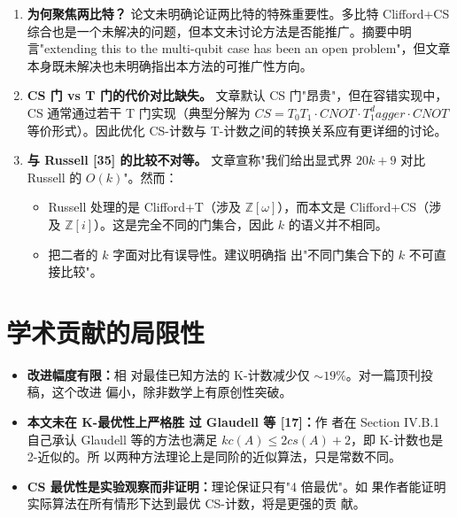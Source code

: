 \documentclass[10pt,a4paper]{article}
\def\dagger{dagger}%
\def\mathrm#1{#1}%
\begin{document}
\begin{enumerate}[label=(\roman*)]
\item \textbf{为何聚焦两比特？} 论文未明确论证两比特的特殊重要性。多比特 Clifford+CS 综合也是一个未解决的问题，但本文未讨论方法是否能推广。摘要中明言"extending this to the multi-qubit case has been an open problem"，但文章本身既未解决也未明确指出本方法的可推广性方向。
 
\item \textbf{CS 门 vs T 门的代价对比缺失。} 文章默认 CS 门"昂贵"，但在容错实现中，CS 通常通过若干 T 门实现（典型分解为 $\mathrm{CS} = T_0 T_1 \cdot \mathrm{CNOT} \cdot T_1^\dagger \cdot \mathrm{CNOT}$ 等价形式）。因此优化 CS-计数与 T-计数之间的转换关系应有更详细的讨论。
 
\item \textbf{与 Russell [35] 的比较不对等。} 文章宣称"我们给出显式界 $20k+9$ 对比 Russell 的 $O(k)$"。然而：
\begin{itemize}
\item Russell 处理的是 Clifford+T（涉及 $\mathbb{Z}[\omega]$），而本文是 Clifford+CS（涉及 $\mathbb{Z}[i]$）。这是完全不同的门集合，因此 $k$ 的语义并不相同。
\item 把二者的 $k$ 字面对比有误导性。建议明确指
  出"不同门集合下的 $k$ 不可直接比较"。
\end{itemize}
\end{enumerate}
 
\section{学术贡献的局限性}
 
\begin{itemize}
\item \textbf{改进幅度有限：}相
  对最佳已知方法的 K-计数减少仅 ${\sim}19\%$。对一篇顶刊投稿，这个改进
  偏小，除非数学上有原创性突破。
 
\item \textbf{本文未在 K-最优性上严格胜
    过 Glaudell 等 [17]：}作
  者在 Section IV.B.1 自己承认 Glaudell 等的方法也满足
  $\mathrm{kc}(A) \leq 2\mathrm{cs}(A) + 2$，即 K-计数也是 2-近似的。所
  以两种方法理论上是同阶的近似算法，只是常数不同。
 
\item \textbf{CS 最优性是实验观察而非证明：}理论保证只有"4 倍最优"。如
  果作者能证明实际算法在所有情形下达到最优 CS-计数，将是更强的贡
  献。
\end{itemize}
 
\end{document}
